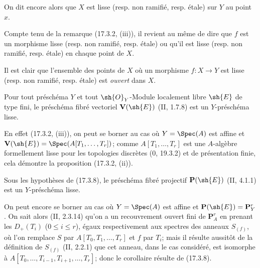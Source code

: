 On dit encore alors que $X$ est lisse (resp. non ramifié, resp. étale) sur $Y$ au point $x$.

Compte tenu de la remarque (17.3.2, (iii)), il revient au même de dire que $f$ est un morphisme lisse (resp. non ramifié, resp. étale) ou qu'il est lisse (resp. non ramifié, resp. étale) en chaque point de $X$.

Il est clair que l'ensemble des points de $X$ où un morphisme $f:X\to Y$ est lisse (resp. non ramifié, resp. étale) est \emph{ouvert} dans $X$.

\begin{proposition}[17.3.8]
\label{IV.17.3.8}
Pour tout préschéma $Y$ et tout $\sh{O}_Y$-Module localement libre $\sh{E}$ de type fini, le préschéma fibré vectoriel $\mathbf{V}(\sh{E})$ (II, 1.7.8) est un $Y$-préschéma lisse.
\end{proposition}

En effet (17.3.2, (iii)), on peut se borner au cas où $Y=\Spec(A)$ est affine et $\mathbf{V}(\sh{E})=\Spec(A[T_1,\ldots,T_r])$; comme $A[T_1,\ldots,T_r]$ est une $A$-algèbre formellement lisse pour les topologies discrètes (0, 19.3.2) et de présentation finie, cela démontre la proposition (17.3.2, (ii)).

\begin{corollary}[17.3.9]
\label{IV.17.3.9}
Sous les hypothèses de (17.3.8), le préschéma fibré projectif $\mathbf{P}(\sh{E})$ (II, 4.1.1) est un $Y$-préschéma lisse.
\end{corollary}

On peut encore se borner au cas où $Y=\Spec(A)$ est affine et $\mathbf{P}(\sh{E})=\mathbf{P}^r_Y$. On sait alors (II, 2.3.14) qu'on a un recouvrement ouvert fini de $\mathbf{P}^r_A$ en prenant les $D_+(T_i)$ ($0\leq i\leq r$), égaux respectivement aux spectres des anneaux $S_{(f)}$, où l'on remplace $S$ par $A[T_0,T_1,\ldots,T_r]$ et $f$ par $T_i$; mais il résulte aussitôt de la définition de $S_{(f)}$ (II, 2.2.1) que cet anneau, dans le cas considéré, est isomorphe à $A[T_0,\ldots,T_{i-1},T_{i+1},\ldots,T_r]$; donc le corollaire résulte de (17.3.8).

